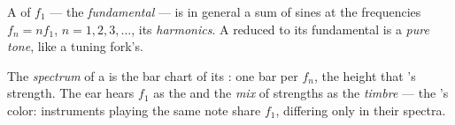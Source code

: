 \begin{definition}[Harmonics]\label{def:g12:sound-acoustics:harmonics}
A   of  $f_1$ --- the
\emph{fundamental} --- is in general a sum of
sines at the frequencies $f_n = n f_1$, $n = 1, 2, 3, \dots$, its
\emph{harmonics}. A  reduced to its fundamental
is a \emph{pure tone}, like a tuning fork's.
\end{definition}

\begin{definition}\label{def:g12:sound-acoustics:timbre}
The \emph{spectrum} of a  is the bar chart of
its : one bar per $f_n$, the height that 's
strength. The ear hears $f_1$ as the  and the \emph{mix} of
strengths as the \emph{timbre} --- the 's color:
instruments playing the same note share $f_1$, differing only in
their spectra.
\end{definition}

